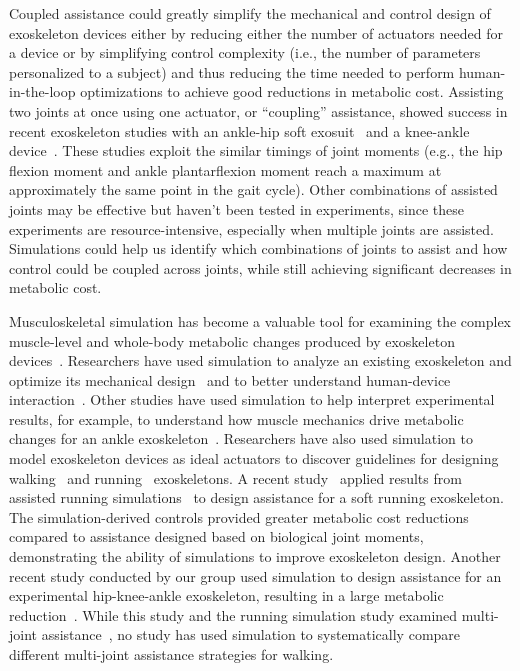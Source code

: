 \documentclass[10pt,letterpaper]{article}
\begin{document}
Coupled assistance could greatly simplify the mechanical and control design of exoskeleton devices either by reducing either the number of actuators needed for a device or by simplifying control complexity (i.e., the number of parameters personalized to a subject) and thus reducing the time needed to perform human-in-the-loop optimizations to achieve good reductions in metabolic cost. Assisting two joints at once using one actuator, or ``coupling'' assistance, showed success in recent exoskeleton studies with an ankle-hip soft exosuit~\cite{Ding:2017, Panizzolo:2016, Quinlivan:2017, Lee:2018} and a knee-ankle device~\cite{Malcolm:2018}. These studies exploit the similar timings of joint moments (e.g., the hip flexion moment and ankle plantarflexion moment reach a maximum at approximately the same point in the gait cycle). Other combinations of assisted joints may be effective but haven’t been tested in experiments, since these experiments are resource-intensive, especially when multiple joints are assisted. Simulations could help us identify which combinations of joints to assist and how control could be coupled across joints, while still achieving significant decreases in metabolic cost.  

Musculoskeletal simulation has become a valuable tool for examining the complex muscle-level and whole-body metabolic changes produced by exoskeleton devices~\cite{Grabke:2019}. Researchers have used simulation to analyze an existing exoskeleton and optimize its mechanical design~\cite{Manns:2017} and to better understand human-device interaction~\cite{Fournier:2018}. Other studies have used simulation to help interpret experimental results, for example, to understand how muscle mechanics drive metabolic changes for an ankle exoskeleton~\cite{Jackson:2017}. Researchers have also used simulation to model exoskeleton devices as ideal actuators to discover guidelines for designing walking~\cite{Dembia:2017} and running~\cite{Uchida:2016} exoskeletons. A recent study~\cite{Lee:2017} applied results from assisted running simulations~\cite{Uchida:2016} to design assistance for a soft running exoskeleton. The simulation-derived controls provided greater metabolic cost reductions compared to assistance designed based on biological joint moments, demonstrating the ability of simulations to improve exoskeleton design. Another recent study conducted by our group used simulation to design assistance for an experimental hip-knee-ankle exoskeleton, resulting in a large metabolic reduction~\cite{Franks:2020}. While this study and the running simulation study examined multi-joint assistance~\cite{Uchida:2016}, no study has used simulation to systematically compare different multi-joint assistance strategies for walking.
\end{document}
